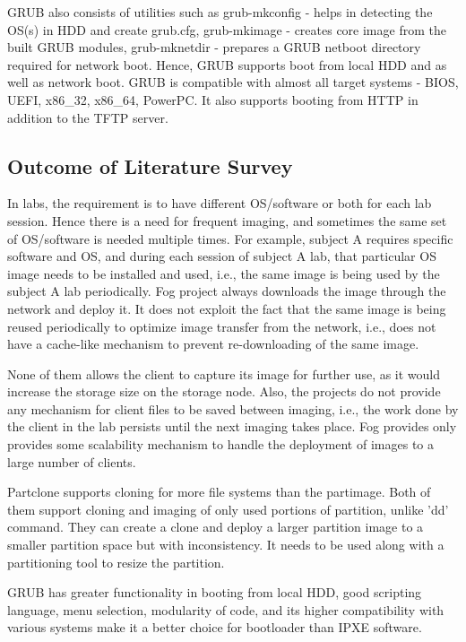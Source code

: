 \documentclass[a4paper,12pt]{article}
\begin{document}
GRUB also consists of utilities such as grub-mkconfig - helps in detecting the OS(s) in HDD and create grub.cfg, grub-mkimage - creates core image from the built GRUB modules, grub-mknetdir - prepares a GRUB netboot directory required for network boot. Hence, GRUB supports boot from local HDD and as well as network boot. GRUB is compatible with almost all target systems - BIOS, UEFI, x86\_32, x86\_64, PowerPC. It also supports booting from HTTP in addition to the TFTP server.

\subsection{ Outcome of Literature Survey}
In labs, the requirement is to have different OS/software or both for each lab session. Hence there is a need for frequent imaging, and sometimes the same set of OS/software is needed multiple times. For example, subject A requires specific software and OS, and during each session of subject A lab, that particular OS image needs to be installed and used, i.e., the same image is being used by the subject A lab periodically. Fog project always downloads the image through the network and deploy it. It does not exploit the fact that the same image is being reused periodically to optimize image transfer from the network, i.e., does not have a cache-like mechanism to prevent re-downloading of the same image.

None of them allows the client to capture its image for further use, as it would increase the storage size on the storage node. Also,  the projects do not provide any mechanism for client files to be saved between imaging, i.e., the work done by the client in the lab persists until the next imaging takes place. Fog provides only provides some scalability mechanism to handle the deployment of images to a large number of clients.  

Partclone supports cloning for more file systems than the partimage. Both of them support cloning and imaging of only used portions of partition, unlike 'dd' command. They can create a clone and deploy a larger partition image to a smaller partition space but with inconsistency. It needs to be used along with a partitioning tool to resize the partition.

GRUB has greater functionality in booting from local HDD, good scripting language, menu selection, modularity of code, and its higher compatibility with various systems make it a better choice for bootloader than IPXE software.
\end{document}
